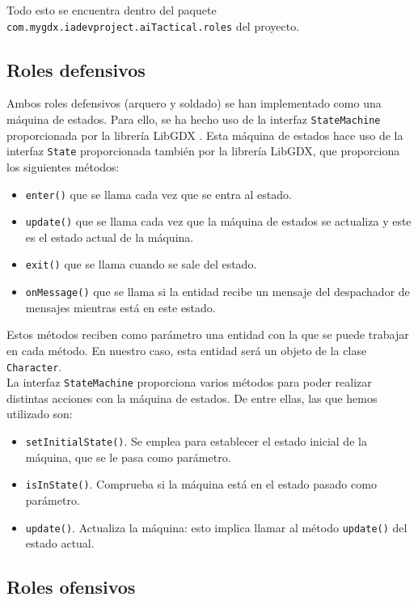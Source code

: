 Todo esto se encuentra dentro del paquete \texttt{com.mygdx.iadevproject.aiTactical.roles} del proyecto.


\medskip
\subsection{Roles defensivos}
Ambos roles defensivos (arquero y soldado) se han implementado como una máquina de estados. Para ello, se ha hecho uso de la interfaz \texttt{StateMachine} proporcionada por la librería LibGDX \cite{stateMachine}. Esta máquina de estados hace uso de la interfaz \texttt{State} proporcionada también por la librería LibGDX, que proporciona los siguientes métodos:
\begin{itemize}
  \item \texttt{enter()} que se llama cada vez que se entra al estado. 
  \item \texttt{update()} que se llama cada vez que la máquina de estados se actualiza y este es el estado actual de la máquina.
  \item \texttt{exit()} que se llama cuando se sale del estado.
  \item \texttt{onMessage()} que se llama si la entidad recibe un mensaje del despachador de mensajes mientras está en este estado. 
\end{itemize}

Estos métodos reciben como parámetro una entidad con la que se puede trabajar en cada método. En nuestro caso, esta entidad será un objeto de la clase \texttt{Character}. \\

La interfaz \texttt{StateMachine} proporciona varios métodos para poder realizar distintas acciones con la máquina de estados. De entre ellas, las que hemos utilizado son:
\begin{itemize}
 \item \texttt{setInitialState()}. Se emplea para establecer el estado inicial de la máquina, que se le pasa como parámetro.
 \item \texttt{isInState()}. Comprueba si la máquina está en el estado pasado como parámetro.
 \item \texttt{update()}. Actualiza la máquina: esto implica llamar al método \texttt{update()} del estado actual. 
\end{itemize}





\medskip
\subsection{Roles ofensivos}
